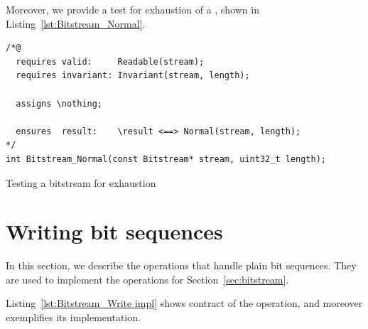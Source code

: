 \FloatBarrier

Moreover, we provide a test for exhaustion of a ,
shown in Listing~\ref{lst:Bitstream_Normal}.


\begin{listing}[hbt]
\begin{minipage}{0.99\textwidth}
\begin{lstlisting}[style=acsl-block]
/*@
  requires valid:     Readable(stream);
  requires invariant: Invariant(stream, length);

  assigns \nothing;

  ensures  result:    \result <==> Normal(stream, length);
*/
int Bitstream_Normal(const Bitstream* stream, uint32_t length);
\end{lstlisting}
\end{minipage}
\caption{\label{lst:Bitstream_Normal}Testing a bitstream for exhaustion}
\end{listing}



\FloatBarrier


\section{Writing bit sequences}
\label{sec:writing bit sequences}

In this section, we describe the operations that handle plain bit sequences.
%
They are used to implement the  operations for
Section~\ref{sec:bitstream}.

Listing~\ref{lst:Bitstream_Write impl} shows contract of
the  operation,
and moreover exemplifies its implementation.


